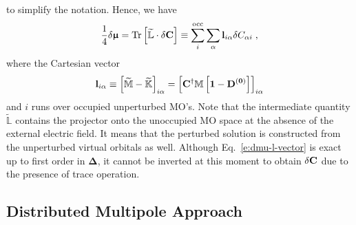 \documentclass[aip,graphicx]{revtex4-1}
\newcommand{\BM}[1]{\bm{#1}}
\DeclareMathOperator{\Tr}{Tr}
\begin{document}
%
to simplify the notation. Hence, we have
%
\begin{equation} \label{e:dmu-l-vector}
  \frac{1}{4} 
 \delta {\BM{\upmu}} %
   =
   \Tr{ 
    \left[ 
         \widetilde{\mathbb{L}} \cdot \delta {\bf C}
    \right] }
   \equiv \sum_{i}^{\rm occ} \sum_\alpha {\bf l}_{i\alpha} \delta C_{\alpha i} \;,
\end{equation}
%
where the Cartesian vector
%
\begin{equation}\label{e:l-vector}
 {\bf l}_{i\alpha} \equiv \left[ \widetilde{\mathbb{M}} - \widetilde{\mathbb{K}} \right]_{i\alpha} 
      = \left[  {\bf C}^\dagger \mathbb{M} \left[ \bf{1} - \bf{D}^{(0)} \right] \right]_{i\alpha}
\end{equation}
%
and $i$ runs over occupied unperturbed MO's.
Note that the intermediate quantity $\widetilde{\mathbb{L}}$ contains the projector onto
the unoccupied MO space at the absence of the external electric field. It means that the
perturbed solution is constructed from the unperturbed virtual orbitals as well.
Although Eq.~\eqref{e:dmu-l-vector}
is exact up to first order in ${\BM\Delta}$, it cannot be inverted at this moment to obtain $\delta {\bf C}$
due to the presence of trace operation. 

\subsection{Distributed Multipole Approach}
\end{document}
